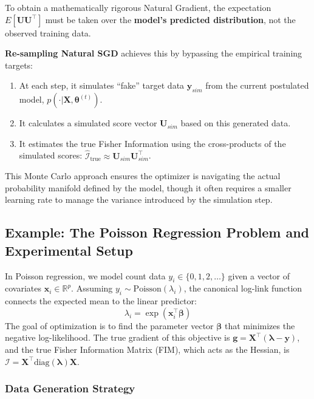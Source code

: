 \documentclass[
  letterpaper,
  DIV=11,
  numbers=noendperiod]{scrreprt}
\providecommand{\tightlist}{%
  \setlength{\itemsep}{0pt}\setlength{\parskip}{0pt}}
\renewcommand{\[}{\begin{equation}}
\renewcommand{\]}{\end{equation}}
\theoremstyle{definition}
\theoremstyle{plain}
\theoremstyle{plain}
\theoremstyle{plain}
\theoremstyle{definition}
\theoremstyle{plain}
\theoremstyle{remark}
\begin{document}
To obtain a mathematically rigorous Natural Gradient, the expectation
\(E[\mathbf{U}\mathbf{U}^\top]\) must be taken over the \textbf{model's
predicted distribution}, not the observed training data.

\textbf{Re-sampling Natural SGD} achieves this by bypassing the
empirical training targets:

\begin{enumerate}
\def\labelenumi{\arabic{enumi}.}
\tightlist
\item
  At each step, it simulates ``fake'' target data \(\mathbf{y}_{sim}\)
  from the current postulated model,
  \(p(\cdot | \mathbf{X}, \boldsymbol{\theta}^{(t)})\).
\item
  It calculates a simulated score vector \(\mathbf{U}_{sim}\) based on
  this generated data.
\item
  It estimates the true Fisher Information using the cross-products of
  the simulated scores:
  \(\hat{\mathcal{I}}_{\text{true}} \approx \mathbf{U}_{sim} \mathbf{U}_{sim}^\top\).
\end{enumerate}

This Monte Carlo approach ensures the optimizer is navigating the actual
probability manifold defined by the model, though it often requires a
smaller learning rate to manage the variance introduced by the
simulation step.

\subsection{Example: The Poisson Regression Problem and Experimental
Setup}\label{example-the-poisson-regression-problem-and-experimental-setup}

In Poisson regression, we model count data
\(y_i \in \{0, 1, 2, \dots\}\) given a vector of covariates
\(\mathbf{x}_i \in \mathbb{R}^p\). Assuming
\(y_i \sim \text{Poisson}(\lambda_i)\), the canonical log-link function
connects the expected mean to the linear predictor: \[
\lambda_i = \exp(\mathbf{x}_i^\top \boldsymbol{\beta})
\] The goal of optimization is to find the parameter vector
\(\boldsymbol{\beta}\) that minimizes the negative log-likelihood. The
true gradient of this objective is
\(\mathbf{g} = \mathbf{X}^\top(\boldsymbol{\lambda} - \mathbf{y})\), and
the true Fisher Information Matrix (FIM), which acts as the Hessian, is
\(\mathcal{I} = \mathbf{X}^\top \text{diag}(\boldsymbol{\lambda}) \mathbf{X}\).

\subsubsection{Data Generation Strategy}\label{data-generation-strategy}
\end{document}
